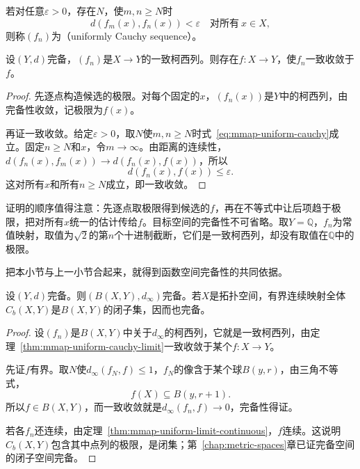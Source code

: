 \begin{definition}[一致柯西列]
\label{def:mmap-uniform-cauchy}
若对任意$\varepsilon>0$，存在$N$，使$m,n\geq N$时
\begin{equation}
 d(f_m(x),f_n(x))<\varepsilon\quad\text{对所有}\ x\in X,
 \label{eq:mmap-uniform-cauchy}
\end{equation}
则称$(f_n)$为（uniformly Cauchy sequence）。
\end{definition}

\begin{theorem}[一致柯西列的一致极限]
\label{thm:mmap-uniform-cauchy-limit}
设$(Y,d)$完备，$(f_n)$是$X\to Y$的一致柯西列。则存在$f:X\to Y$，使$f_n$一致收敛于$f$。
\end{theorem}

\begin{proof}
先逐点构造候选的极限。对每个固定的$x$，$(f_n(x))$是$Y$中的柯西列，由完备性收敛，记极限为$f(x)$。

再证一致收敛。给定$\varepsilon>0$，取$N$使$m,n\geq N$时式~\eqref{eq:mmap-uniform-cauchy}成立。固定$n\geq N$和$x$，令$m\to\infty$。由距离的连续性，$d(f_n(x),f_m(x))\to d(f_n(x),f(x))$，所以
\[
 d(f_n(x),f(x))\leq\varepsilon.
\]
这对所有$x$和所有$n\geq N$成立，即一致收敛。
\end{proof}

证明的顺序值得注意：先逐点取极限得到候选的$f$，再在不等式中让后项趋于极限，把对所有$x$统一的估计传给$f$。目标空间的完备性不可省略。取$Y=\mathbb Q$，$f_n$为常值映射，取值为$\sqrt2$的第$n$个十进制截断，它们是一致柯西列，却没有取值在$\mathbb Q$中的极限。

把本小节与上一小节合起来，就得到函数空间完备性的共同依据。

\begin{theorem}[有界映射空间的完备性]
\label{thm:mmap-bounded-maps-complete}
设$(Y,d)$完备。则$(B(X,Y),d_\infty)$完备。若$X$是拓扑空间，有界连续映射全体$C_b(X,Y)$是$B(X,Y)$的闭子集，因而也完备。
\end{theorem}

\begin{proof}
设$(f_n)$是$B(X,Y)$中关于$d_\infty$的柯西列，它就是一致柯西列，由定理~\ref{thm:mmap-uniform-cauchy-limit}一致收敛于某个$f:X\to Y$。

先证$f$有界。取$N$使$d_\infty(f_N,f)\leq1$，$f_N$的像含于某个球$B(y,r)$，由三角不等式，
\[
 f(X)\subseteq B(y,r+1).
\]
所以$f\in B(X,Y)$，而一致收敛就是$d_\infty(f_n,f)\to0$，完备性得证。

若各$f_n$还连续，由定理~\ref{thm:mmap-uniform-limit-continuous}，$f$连续。这说明$C_b(X,Y)$包含其中点列的极限，是闭集；第~\ref{chap:metric-spaces}章已证完备空间的闭子空间完备。
\end{proof}

